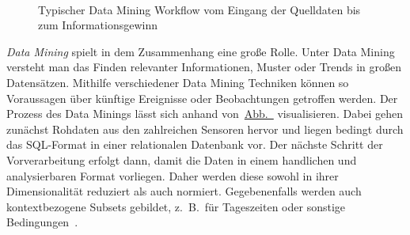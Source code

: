 \begin{figure}[t!]
    \centering
    \caption{\centering Typischer Data Mining Workflow vom Eingang der Quelldaten bis zum Informationsgewinn}
~\label{fig:data_mining}
\end{figure}

\textit{Data Mining} spielt in dem Zusammenhang eine große Rolle. Unter Data Mining versteht man das Finden relevanter Informationen,
Muster oder Trends in großen Datensätzen. Mithilfe verschiedener Data Mining Techniken können so Voraussagen über künftige Ereignisse oder
Beobachtungen getroffen werden. Der Prozess des Data Minings lässt sich anhand von~\hyperref[fig:data_mining]{Abb.~}
visualisieren. Dabei gehen zunächst Rohdaten aus den zahlreichen Sensoren hervor und liegen bedingt durch das SQL-Format in einer
relationalen Datenbank vor. Der nächste Schritt der Vorverarbeitung erfolgt dann, damit die Daten in einem handlichen und analysierbaren
Format vorliegen. Daher werden diese sowohl in ihrer Dimensionalität reduziert als auch normiert. Gegebenenfalls werden auch
kontextbezogene Subsets gebildet, z.~B.~für Tageszeiten oder sonstige Bedingungen~\Cite[Kap.~1]{Tan2014}.

